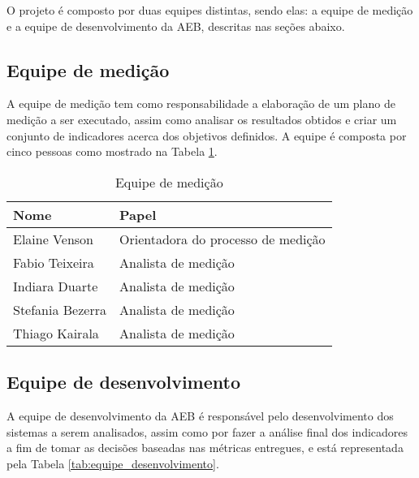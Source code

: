 O projeto é composto por duas equipes distintas, sendo elas: a equipe de medição e a equipe de desenvolvimento da AEB, descritas nas seções abaixo.

\subsection{Equipe de medição}

	A equipe de medição tem como responsabilidade a elaboração de um plano de medição a ser executado, assim como analisar os resultados obtidos e criar um conjunto de indicadores acerca dos objetivos definidos. A equipe é composta por cinco pessoas como mostrado na Tabela  \ref{tab:equipe_medicao}.

\begin{table}[H]
\centering
\begin{tabular}{|p{4cm}|p{5cm}|}
\hline
	\textbf{Nome} &
	\textbf{Papel}
	\\ \hline
	Elaine Venson &
	Orientadora do processo de medição
	\\ \hline
	Fabio Teixeira &
	Analista de medição
	\\ \hline
	Indiara Duarte &
	Analista de medição
	\\ \hline
	Stefania Bezerra &
	Analista de medição
	\\ \hline
	Thiago Kairala &
	Analista de medição
	\\ \hline
\end{tabular}
\caption{Equipe de medição}
\label{tab:equipe_medicao}
\end{table}

\subsection{Equipe de desenvolvimento}

A equipe de desenvolvimento da AEB é responsável pelo desenvolvimento dos sistemas a serem analisados, assim como por fazer a análise final dos indicadores a fim de tomar as decisões baseadas nas métricas entregues, e está representada pela Tabela \ref{tab:equipe_desenvolvimento}.


